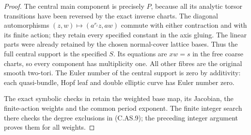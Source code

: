 \begin{proof}
The central main component is
precisely $P$, because all its
analytic torsor transitions have
been reversed by the exact inverse
charts. The diagonal automorphisms
$(z,w)\mapsto(a^{r_i}z,aw)$ commute
with either contraction and with
its finite action; they retain
every specified constant in the
axis gluing. The linear parts were
already retained by the chosen
normal-cover lattice bases.
Thus the full central support is
the specified $S$. Its equations
are $xw=s$ in the free coarse
charts, so every component has
multiplicity one. All other fibres
are the original smooth two-tori.
The Euler number of the central
support is zero by additivity:
each quasi-bundle, Hopf leaf and
double elliptic curve has Euler
number zero.

The exact symbolic checks in
retain the weighted base map, its
Jacobian, the finite-action weights
and the common period exponent.
The finite integer search there
checks the degree exclusions in
(C.AS.9); the preceding integer
argument proves them for all weights.
\end{proof}
